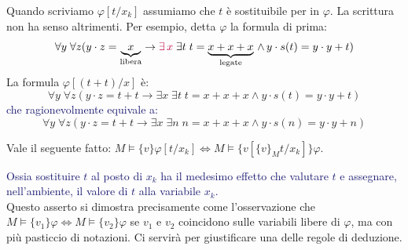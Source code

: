 \begin{note}
    Quando scriviamo $\varphi[t/x_k]$ assumiamo che $t$ è sostituibile per  in $\varphi$. La scrittura non ha senso altrimenti.
    Per esempio, detta $\varphi$ la formula di prima:
    \[ \forall y \; \forall z (y\cdot z = \underbrace{x}_{\text{libera}} \to \textcolor{purple}{\exists\, x} \; \exists t \; t = \underbrace{x + x + x}_{\text{legate}}\, \land \,y\cdot s(t) = y \cdot y + t)
    \]
    La formula $\varphi[(t+t)/x]$ è:
    \[ \forall y \; \forall z (y\cdot z = t+t \to \exists x \; \exists t \; t = x + x + x \land y\cdot s(t) = y \cdot y + t)
    \]
    \textcolor{MidnightBlue}{che ragionevolmente equivale a:}
    \[ \forall y \; \forall z (y\cdot z = t+t \to \exists x \; \exists n \; n = x + x + x \land y\cdot s(n) = y \cdot y + n)
    \]
\end{note}

\begin{exercise}
    Vale il seguente fatto: $M \models\{v\} \varphi[t/x_k] \iff M \models\{v[\{v\}_M t/x_k]\} \varphi$.
\end{exercise}

\textcolor{MidnightBlue}{Ossia sostituire $t$ al posto di $x_k$  ha il medesimo effetto che valutare $t$ e assegnare, nell'ambiente, il valore di $t$ alla variabile $x_k$.}\\
Questo asserto si dimostra precisamente come l'osservazione che $M \models\{v_1\} \varphi \iff M \models\{v_2\} \varphi$ se $v_1$ e $v_2$ coincidono sulle variabili libere di $\varphi$, ma 
con più pasticcio di notazioni. Ci servirà per giustificare una delle regole di deduzione.

